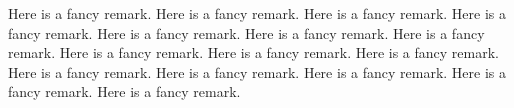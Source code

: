 
\begin{remark}
Here is a fancy remark. Here is a fancy remark. Here is a fancy remark. Here is a fancy remark. Here is a fancy remark. Here is a fancy remark. Here is a fancy remark. Here is a fancy remark. Here is a fancy remark. Here is a fancy remark. Here is a fancy remark. Here is a fancy remark. Here is a fancy remark. Here is a fancy remark. Here is a fancy remark. 
\end{remark}

























